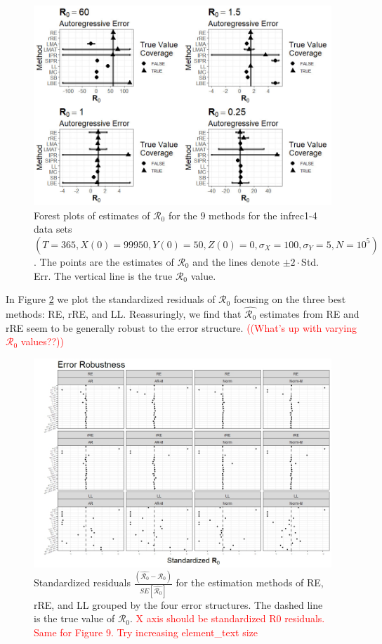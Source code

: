 \documentclass[12pt]{article}
\newcommand{\com}[1]{\textcolor{red}{ #1}}
\newcommand{\xxsir}{\ensuremath{9} } %
\newcommand{\rr}{\ensuremath{\mathcal{R}_0}}
\begin{document}
\begin{figure}[H]
	\centering
	\includegraphics[scale=0.5]{images/parchange_ar.jpg}
	\caption{Forest plots of estimates of $\rr$ for the \xxsir methods for the infrec1-4 data sets $(T=365, X(0)=99950, Y(0)=50, Z(0)=0, \sigma_X=100, \sigma_Y=5, N=10^5)$.  The points are the estimates of $\rr$ and the lines denote $\pm 2\cdot $Std. Err.  The vertical line is the true $\rr$ value.}\label{fig:ar-r0}
\end{figure}


 In Figure \ref{fig:err-rob} we plot the standardized residuals of $\rr$ focusing on the three best methods: RE, rRE, and LL.  Reassuringly, we find that $\hat{\rr}$ estimates from RE and rRE seem to be generally robust to the error structure.  \com{((What's up with varying $\rr$ values??))}

\begin{figure}[H]
	\centering
	\includegraphics[scale=0.5]{images/err_robust.jpeg}
	\caption{Standardized residuals $\frac{\left ( \hat{\rr} - \rr\right ) }{SE \left [\hat{\rr}\right ]}$ for the estimation methods of RE, rRE, and LL grouped by the four error structures.  The dashed line is the true value of $\rr$. \com{X axis should be standardized R0 residuals.  Same for Figure 9.  Try increasing element\_text size}}\label{fig:err-rob}
\end{figure}
\end{document}
